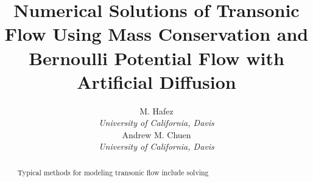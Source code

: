 \documentclass{article}
\title{Numerical Solutions of Transonic Flow Using Mass Conservation and Bernoulli Potential Flow with Artificial Diffusion}
\author{M. Hafez\\\textit{University of California, Davis}\\Andrew M. Chuen\\\textit{University of California, Davis}
}
\begin{document}
\maketitle

\begin{abstract}
	\lipsum[20]
	Typical methods for modeling transonic flow include solving  
	
	
	
	
\end{abstract}
\end{document}
